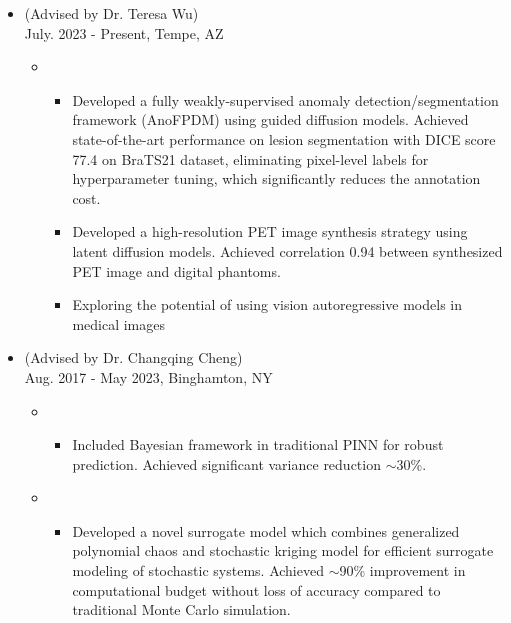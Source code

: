 \documentclass[10pt]{article}
\begin{document}
\begin{itemize}
	\item {} (Advised by Dr. Teresa Wu)\\
        \hfill{July. 2023 - Present, Tempe, AZ}
		\vspace{-0.5em}
        \begin{itemize}[label=$\bullet$]
			\setlength\itemsep{0.5pt}
            \item {}
            \vspace{-0.5em}
            \begin{itemize}[label=$-$]
				\item Developed a fully weakly-supervised anomaly detection/segmentation framework (AnoFPDM) using guided diffusion models. Achieved state-of-the-art performance on lesion segmentation with DICE score 77.4 on BraTS21 dataset, eliminating pixel-level labels for hyperparameter tuning, which significantly reduces the annotation cost.
				\item Developed a high-resolution PET image synthesis strategy using latent diffusion models. Achieved correlation 0.94 between synthesized PET image and digital phantoms.
				\item Exploring the potential of using vision autoregressive models in medical images 
			\end{itemize}
        \end{itemize}
        
	\item {} (Advised by Dr. Changqing Cheng)\\
		\hfill{Aug. 2017 - May 2023, Binghamton, NY}
		\vspace{-0.5em}

		\begin{itemize}[label=$\bullet$]
			\setlength\itemsep{0.5pt}
			\item {}
			\vspace{-0.5em}
			\begin{itemize}[label=$-$]
				\setlength\itemsep{0.5pt}
				\item Included Bayesian framework in traditional PINN for robust prediction. Achieved significant variance reduction $\sim$30\%.
			\end{itemize}
			
			\item {}
			\vspace{-0.5em}
			\begin{itemize}[label=$-$]
				\setlength\itemsep{0.5pt}
				\item Developed a novel surrogate model which combines generalized polynomial chaos and stochastic kriging model for efficient surrogate modeling of stochastic systems. Achieved $\sim$90\% improvement in computational budget without loss of accuracy compared to traditional Monte Carlo simulation.
			

\end{itemize}
\end{itemize}
\end{itemize}
\end{document}
